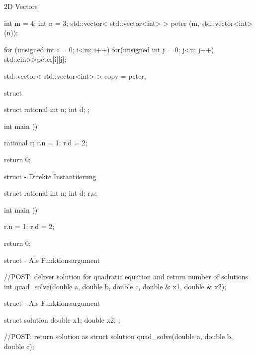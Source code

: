 \ifnum\conditionmacro=1 \documentclass[handout,usenames,dvipsnames]{beamer}\fi
\begin{document}
\begin{frame}[fragile]{2D Vectors}
\begin{TFCpp}
int m = 4;
int n = 3;
std::vector< std::vector<int> > peter (m, std::vector<int>(n));

for (unsigned int i = 0; i<m; i++){
	for(unsigned int j = 0; j<n; j++){
		std::cin>>peter[i][j];
	}
}

std::vector< std::vector<int> > copy = peter;
\end{TFCpp}
\end{frame}

\begin{frame}[fragile]{struct}
\begin{TFCpp}
struct rational{
	int n;
	int d;
};

int main (){
	rational r;
	r.n = 1;
	r.d = 2;
	
	return 0;
}
\end{TFCpp}
\end{frame}

\begin{frame}[fragile]{struct - Direkte Instantiierung}
\begin{TFCpp}
struct rational{
	int n;
	int d;
}r,s;

int main (){
	r.n = 1;
	r.d = 2;
	
	return 0;
}
\end{TFCpp}
\end{frame}

\begin{frame}[fragile]{struct - Als Funktionsargument}
\begin{TFCpp}
//POST: deliver solution for quadratic equation and return number of solutions
int quad_solve(double a, double b, double c, double & x1, double & x2);

\end{TFCpp}
\end{frame}

\begin{frame}[fragile]{struct - Als Funktionsargument}
\begin{TFCpp}
struct solution{
	double x1;
	double x2;
};

//POST: return solution as struct
solution quad_solve(double a, double b, double c);

\end{TFCpp}
\end{frame}

\end{document}

